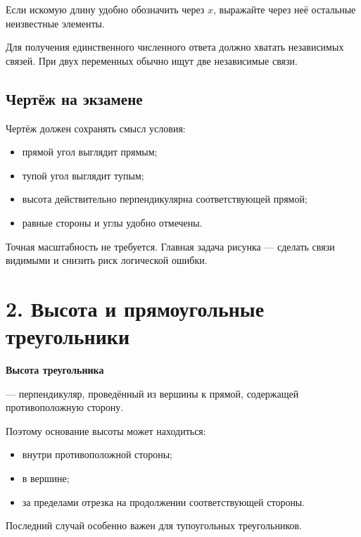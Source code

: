 \documentclass[a4paper,12pt]{article}
\newcommand{\important}[1]{%
  \textbf{\color{darkaccent}#1}%
}
\begin{document}
Если искомую длину удобно обозначить через $x$,
выражайте через неё остальные неизвестные элементы.

Для получения единственного численного ответа
должно хватать независимых связей.
При двух переменных обычно ищут две независимые связи.

\subsection{Чертёж на экзамене}

Чертёж должен сохранять смысл условия:

\begin{itemize}
  \item прямой угол выглядит прямым;
  \item тупой угол выглядит тупым;
  \item высота действительно перпендикулярна
  соответствующей прямой;
  \item равные стороны и углы удобно отмечены.
\end{itemize}

Точная масштабность не требуется.
Главная задача рисунка --- сделать связи видимыми
и снизить риск логической ошибки.


\clearpage
\section{2. Высота и прямоугольные треугольники}

\important{Высота треугольника}
--- перпендикуляр, проведённый из вершины
к прямой, содержащей противоположную сторону.

Поэтому основание высоты может находиться:

\begin{itemize}
  \item внутри противоположной стороны;
  \item в вершине;
  \item за пределами отрезка на продолжении
  соответствующей стороны.
\end{itemize}

Последний случай особенно важен
для тупоугольных треугольников.

\begin{center}
\end{center}
\end{document}
